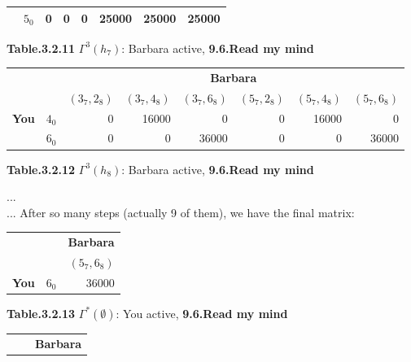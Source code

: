 \documentclass{article}
\begin{document}
\begin{description}
\begin{center}
\begin{tabular}{rrrrrrrr}
        \multicolumn{ 1}{c}{{\bf }} &        $5_0$ &          0 &          0 &          0 &      25000 &      25000 &      25000 \\
        \hline
        \hline
        \end{tabular}

         {\bf Table.3.2.11 }$\Gamma ^3(h_7)$: Barbara active, {\bf 9.6.Read my mind}
    \end{center}

    \begin{center}
        \begin{tabular}{rrrrrrrr}
        \hline
        \hline
                   &            &                                          \multicolumn{ 6}{c}{{\bf Barbara}} \\

                   &            &  $(3_7,2_8)$ &  $(3_7,4_8)$ &  $(3_7,6_8)$ &  $(5_7,2_8)$ &  $(5_7,4_8)$ &  $(5_7,6_8)$ \\
        \hline
        \multicolumn{ 1}{c}{{\bf You}} &        $4_0$ &          0 &      16000 &          0 &          0 &      16000 &          0 \\

        \multicolumn{ 1}{c}{{\bf }} &        $6_0$ &          0 &          0 &      36000 &          0 &          0 &      36000 \\
        \hline
        \hline
        \end{tabular}

        {\bf Table.3.2.12 }$\Gamma ^3(h_8)$: Barbara active, {\bf 9.6.Read my mind}
    \end{center}
    ...\\
    ...
    \newpage
    After so many steps (actually 9 of them), we have the final matrix:
    \begin{center}
        \begin{tabular}{rrr}
        \hline
        \hline
                   &            & {\bf Barbara} \\

                   &            &  $(5_7,6_8)$ \\
        \hline
         {\bf You} &        $6_0$ &      36000 \\
        \hline
        \hline
        \end{tabular}

        {\bf Table.3.2.13 }$\Gamma ^{\text{*}}(\emptyset )$: You active, {\bf 9.6.Read my mind}
    \end{center}
    \begin{center}
        \begin{tabular}{rrr}
        \hline
        \hline
                   &            & {\bf Barbara} \\


\end{tabular}
\end{center}
\end{description}
\end{document}

